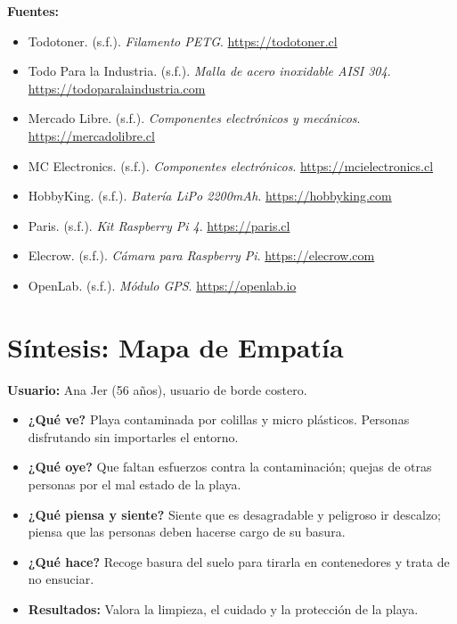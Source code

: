 \documentclass[12pt]{article}
\begin{document}
\begin{enumerate}
\textbf{Fuentes:}
\begin{itemize}
\item Todotoner. (s.f.). \textit{Filamento PETG}. \url{https://todotoner.cl}
\item Todo Para la Industria. (s.f.). \textit{Malla de acero inoxidable AISI 304}. \url{https://todoparalaindustria.com}
\item Mercado Libre. (s.f.). \textit{Componentes electrónicos y mecánicos}. \url{https://mercadolibre.cl}
\item MC Electronics. (s.f.). \textit{Componentes electrónicos}. \url{https://mcielectronics.cl}
\item HobbyKing. (s.f.). \textit{Batería LiPo 2200mAh}. \url{https://hobbyking.com}
\item Paris. (s.f.). \textit{Kit Raspberry Pi 4}. \url{https://paris.cl}
\item Elecrow. (s.f.). \textit{Cámara para Raspberry Pi}. \url{https://elecrow.com}
\item OpenLab. (s.f.). \textit{Módulo GPS}. \url{https://openlab.io}
\end{itemize}

\end{enumerate}


\section{Síntesis: Mapa de Empatía}
\textbf{Usuario:} Ana Jer (56 años), usuario de borde costero.
\begin{itemize}
    \item \textbf{¿Qué ve?} Playa contaminada por colillas y micro plásticos. Personas disfrutando sin importarles el entorno.
    \item \textbf{¿Qué oye?} Que faltan esfuerzos contra la contaminación; quejas de otras personas por el mal estado de la playa.
    \item \textbf{¿Qué piensa y siente?} Siente que es desagradable y peligroso ir descalzo; piensa que las personas deben hacerse cargo de su basura.
    \item \textbf{¿Qué hace?} Recoge basura del suelo para tirarla en contenedores y trata de no ensuciar.
    \item \textbf{Resultados:} Valora la limpieza, el cuidado y la protección de la playa.
\end{itemize}
\end{document}
